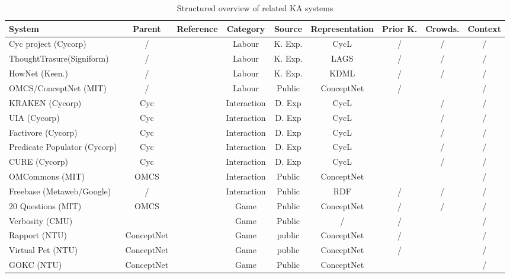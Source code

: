 \begin{landscape}
	\begin{table}[htb]
	\caption{Structured overview of related KA systems}
	\label{tab:related}
	\centering
	\begin{tabular}{lclcccccc}
		\hline
		System & Parent & Reference & Category & Source & Representation & Prior K. &  Crowds. & Context \\
		\hline
		Cyc project (Cycorp) & / & \parencite{Lenat1995} & Labour & K. Exp. & CycL & / & / & / \\
		ThoughtTrasure(Signiform) & / & \parencite{Mueller2003} & Labour & K. Exp. & LAGS & / & / & / \\
		HowNet (Keen.) & / & \parencite{Dong2010} & Labour & K. Exp. & KDML & / & / & / \\
		OMCS/ConceptNet (MIT) & / & \parencite{Singh2002a} & Labour & Public & ConceptNet & / & \checkmark & / \\
		KRAKEN (Cycorp) & Cyc & \parencite{Panton2002a} & Interaction & D. Exp & CycL & \checkmark & / & / \\
		UIA (Cycorp) & Cyc & \parencite{Witbrock2003UIA} & Interaction & D. Exp & CycL & \checkmark & / & / \\
		Factivore (Cycorp) & Cyc & \parencite{Witbrock2005} & Interaction & D. Exp & CycL & \checkmark & / & / \\
		Predicate Populator (Cycorp) & Cyc & \parencite{Witbrock2005} & Interaction & D. Exp & CycL & \checkmark & / & / \\
		CURE (Cycorp) & Cyc & \parencite{Witbrock2010} & Interaction & D. Exp & CycL & \checkmark & / & / \\
		OMCommons (MIT) & OMCS & \parencite{Speer2007} & Interaction & Public & ConceptNet & \checkmark & \checkmark & / \\
		Freebase (Metaweb/Google) & / & \parencite{Bollacker2008} & Interaction & Public & RDF & / & / & / \\
		20 Questions (MIT) & OMCS & \parencite{Speer2009} & Game & Public & ConceptNet & / & / & / \\
		Verbosity (CMU) &   & \parencite{VonAhn2006a}  & Game & Public & /  & /  & \checkmark  & /  \\
		Rapport (NTU) & ConceptNet &  \parencite{Kuo2009}  & Game & public  & ConceptNet  & /  & \checkmark  & /  \\
		Virtual Pet (NTU) & ConceptNet  &  \parencite{Kuo2009}  & Game &  public & ConceptNet  & /  & \checkmark  & /  \\
		GOKC (NTU) & ConceptNet  & \parencite{Kuo2010}  & Game & Public  & ConceptNet  & \checkmark  & \checkmark  & /  \\

\end{tabular}
\end{table}
\end{landscape}
